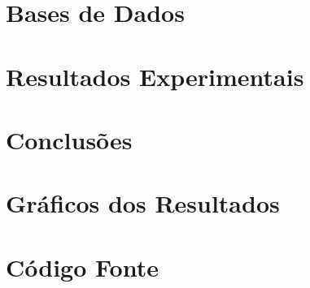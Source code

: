 \documentclass[a4paper,12pt,oneside,openany]{book}
\begin{document}
\chapter{Bases de Dados}
\label{cap5}


\chapter{Resultados Experimentais}
\label{cap6}


\chapter{Conclusões}
\label{cap7}


\normalsize
\cleardoublepage
{}
 


   \appendix
\chapter{Gráficos dos Resultados}
   \label{ApendiceA}
   
   \chapter{Código Fonte}
   \label{ApendiceB}
   

\backmatter
\end{document}
